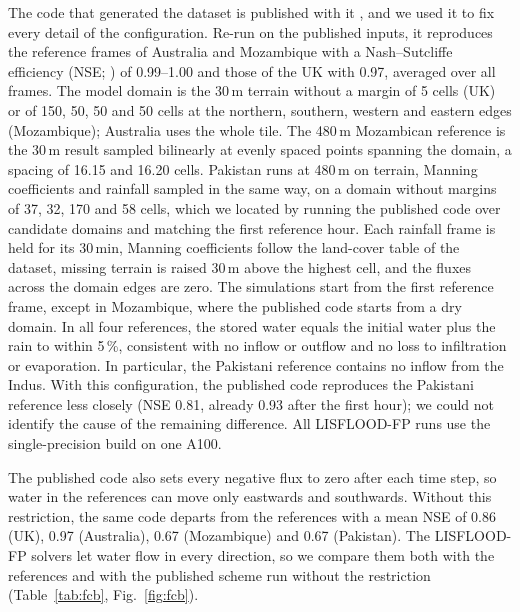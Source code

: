 \documentclass[preprint,12pt,authoryear]{elsarticle}
\begin{document}
The code that generated the dataset is published with it
\citep{Xu2025floodcastbenchcode}, and we used it to fix every detail of the
configuration. Re-run on the published inputs, it reproduces the reference
frames of Australia and Mozambique with a Nash--Sutcliffe efficiency (NSE;
\citealp{NashSutcliffe1970}) of 0.99--1.00 and those of the UK with 0.97,
averaged over all frames. The model domain is the 30\,m terrain without a
margin of 5 cells (UK) or of 150, 50, 50 and 50 cells at the northern,
southern, western and eastern edges (Mozambique); Australia uses the whole
tile. The 480\,m Mozambican reference is the 30\,m result sampled bilinearly
at evenly spaced points spanning the domain, a spacing of 16.15 and 16.20 cells.
Pakistan runs at 480\,m on terrain, Manning coefficients and rainfall
sampled in the same way, on a domain without margins of 37, 32, 170 and
58 cells, which we located by running the published code over candidate
domains and matching the first reference hour. Each rainfall frame is held
for its 30\,min, Manning coefficients follow the land-cover table of the
dataset, missing terrain is raised 30\,m above the highest cell, and the
fluxes across the domain edges are zero. The simulations start from the
first reference frame, except in Mozambique, where the published code
starts from a dry domain. In all four references, the stored water equals
the initial water plus the rain to within 5\,\%, consistent with no
inflow or outflow and no loss to infiltration or evaporation. In particular, the
Pakistani reference contains no inflow from the Indus. With this
configuration, the published code reproduces the Pakistani reference less
closely (NSE 0.81, already 0.93 after the first hour); we could not identify
the cause of the remaining difference.
All LISFLOOD-FP runs use the single-precision build on one A100.

The published code also sets every negative flux to zero after each time
step, so water in the references can move only eastwards and southwards.
Without this restriction, the same code departs from the references with
a mean NSE of 0.86 (UK), 0.97 (Australia), 0.67 (Mozambique) and 0.67
(Pakistan). The LISFLOOD-FP solvers let water flow in every direction, so
we compare them both with the references and with the published scheme
run without the restriction (Table~\ref{tab:fcb}, Fig.~\ref{fig:fcb}).
\end{document}
